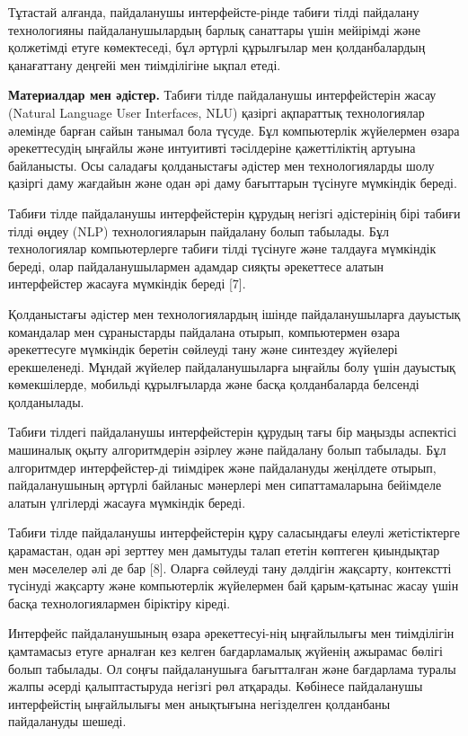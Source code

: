 \begin{multicols}{2}
Тұтастай алғанда, пайдаланушы интерфейсте-рінде табиғи тілді пайдалану
технологияны пайдаланушылардың барлық санаттары үшін мейірімді және
қолжетімді етуге көмектеседі, бұл әртүрлі құрылғылар мен қолданбалардың
қанағаттану деңгейі мен тиімділігіне ықпал етеді.

{\bfseries Материалдар мен әдістер.} Табиғи тілде пайдаланушы
интерфейстерін жасау (Natural Language User Interfaces, NLU) қазіргі
ақпараттық технологиялар әлемінде барған сайын танымал бола түсуде. Бұл
компьютерлік жүйелермен өзара әрекеттесудің ыңғайлы және интуитивті
тәсілдеріне қажеттіліктің артуына байланысты. Осы саладағы қолданыстағы
әдістер мен технологияларды шолу қазіргі даму жағдайын және одан әрі
даму бағыттарын түсінуге мүмкіндік береді.

Табиғи тілде пайдаланушы интерфейстерін құрудың негізгі әдістерінің бірі
табиғи тілді өңдеу (NLP) технологияларын пайдалану болып табылады. Бұл
технологиялар компьютерлерге табиғи тілді түсінуге және талдауға
мүмкіндік береді, олар пайдаланушылармен адамдар сияқты әрекеттесе
алатын интерфейстер жасауға мүмкіндік береді {[}7{]}.

Қолданыстағы әдістер мен технологиялардың ішінде пайдаланушыларға
дауыстық командалар мен сұраныстарды пайдалана отырып, компьютермен
өзара әрекеттесуге мүмкіндік беретін сөйлеуді тану және синтездеу
жүйелері ерекшеленеді. Мұндай жүйелер пайдаланушыларға ыңғайлы болу үшін
дауыстық көмекшілерде, мобильді құрылғыларда және басқа қолданбаларда
белсенді қолданылады.

Табиғи тілдегі пайдаланушы интерфейстерін құрудың тағы бір маңызды
аспектісі машиналық оқыту алгоритмдерін әзірлеу және пайдалану болып
табылады. Бұл алгоритмдер интерфейстер-ді тиімдірек және пайдалануды
жеңілдете отырып, пайдаланушының әртүрлі байланыс мәнерлері мен
сипаттамаларына бейімделе алатын үлгілерді жасауға мүмкіндік береді.

Табиғи тілде пайдаланушы интерфейстерін құру саласындағы елеулі
жетістіктерге қарамастан, одан әрі зерттеу мен дамытуды талап ететін
көптеген қиындықтар мен мәселелер әлі де бар {[}8{]}. Оларға сөйлеуді
тану дәлдігін жақсарту, контекстті түсінуді жақсарту және компьютерлік
жүйелермен бай қарым-қатынас жасау үшін басқа технологиялармен біріктіру
кіреді.

Интерфейс пайдаланушының өзара әрекеттесуі-нің ыңғайлылығы мен
тиімділігін қамтамасыз етуге арналған кез келген бағдарламалық жүйенің
ажырамас бөлігі болып табылады. Ол соңғы пайдаланушыға бағытталған және
бағдарлама туралы жалпы әсерді қалыптастыруда негізгі рөл атқарады.
Көбінесе пайдаланушы интерфейстің ыңғайлылығы мен анықтығына негізделген
қолданбаны пайдалануды шешеді.


\end{multicols}
